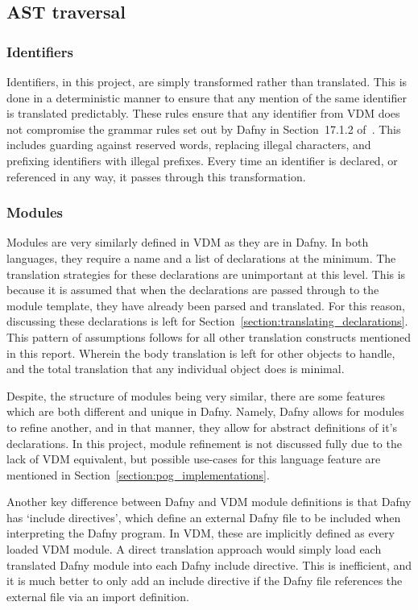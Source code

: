 \documentclass{entcs}
\begin{document}
\subsection{AST traversal}

\subsubsection{Identifiers}\label{section:identifiers}

Identifiers, in this project, are simply transformed rather than translated. This is done in a deterministic manner to ensure that any mention of the same identifier is translated predictably. These rules ensure that any identifier from VDM does not compromise the grammar rules set out by Dafny in Section~17.1.2 of~\cite{DfyRef}. This includes guarding against reserved words, replacing illegal characters, and prefixing identifiers with illegal prefixes. Every time an identifier is declared, or referenced in any way, it passes through this transformation.

\subsubsection{Modules} 

Modules are very similarly defined in VDM as they are in Dafny. In both languages, they require a name and a list of declarations at the minimum. The translation strategies for these declarations are unimportant at this level. This is because it is assumed that when the declarations are passed through to the module template, they have already been parsed and translated. For this reason, discussing these declarations is left for Section~\ref{section:translating_declarations}. This pattern of assumptions follows for all other translation constructs mentioned in this report. Wherein the body translation is left for other objects to handle, and the total translation that any individual object does is minimal.

Despite, the structure of modules being very similar, there are some features which are both different and unique in Dafny. Namely, Dafny allows for modules to refine another, and in that manner, they allow for abstract definitions of it's declarations. In this project, module refinement is not discussed fully due to the lack of VDM equivalent, but possible use-cases for this language feature are mentioned in Section~\ref{section:pog_implementations}.

Another key difference between Dafny and VDM module definitions is that Dafny has `include directives', which define an external Dafny file to be included when interpreting the Dafny program. In VDM, these are implicitly defined as every loaded VDM module. A direct translation approach would simply load each translated Dafny module into each Dafny include directive. This is inefficient, and it is much better to only add an include directive if the Dafny file references the external file via an import definition.
\end{document}
